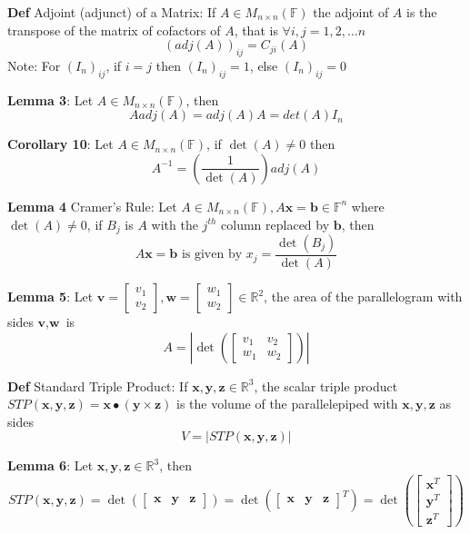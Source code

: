 \documentclass[11pt,notitlepage]{report}
\newcommand{\bb}[1]{\ensuremath{\mathbb{#1}}}
\newcommand{\tbf}[1]{\textbf{#1}}
\begin{document}
\textbf{Def} Adjoint (adjunct) of a Matrix: If $A \in M_{n \times n}(\bb F)$ the adjoint of $A$ is the transpose of the matrix of cofactors of $A$, that is $\forall i, j = 1, 2, \dots n$
$$(adj(A))_{ij} = C_{ji}(A)$$
\hspace*{5mm} Note: For $(I_n)_{ij}$, if $ i = j$ then $(I_n)_{ij} = 1$, else $(I_n)_{ij} = 0$

\textbf{Lemma 3}: Let $A \in M_{n \times n}(\bb F)$, then 
$$A adj(A) = adj(A) A = det(A) I_n$$

\textbf{Corollary 10}: Let $A \in M_{n \times n}(\bb F)$, if $\det(A) \ne 0$ then
$$A^{-1} = \left(\frac{1}{\det(A)}\right)adj(A)$$

\textbf{Lemma 4} Cramer's Rule: Let $A \in M_{n \times n}(\bb F), A\tbf x = \tbf b \in \bb F^n$ where $\det(A) \ne 0$, if $B_j$ is $A$ with the $j^{th}$ column replaced by $\tbf b$, then 
$$A\tbf x = \tbf b \text{ is given by } x_j = \frac{\det(B_j)}{\det(A)}$$

\textbf{Lemma 5}: Let $\tbf v = \begin{bmatrix}v_1\\v_2\end{bmatrix}, \tbf w = \begin{bmatrix}w_1\\w_2\end{bmatrix} \in \bb R^2$, the area of the parallelogram with sides $\tbf v, \tbf w$ is
$$A = \left| \det\left(\begin{bmatrix}v_1 & v_2\\w_1 & w_2\end{bmatrix}\right)\right|$$

\textbf{Def} Standard Triple Product: If $\tbf x, \tbf y, \tbf z \in \bb R^3$, the scalar triple product $STP(\tbf x, \tbf y, \tbf z) = \tbf x \bullet (\tbf y \times \tbf z)$ is the volume of the parallelepiped with $\tbf x, \tbf y, \tbf z$ as sides
$$V = |STP(\tbf x, \tbf y, \tbf z)|$$

\textbf{Lemma 6}: Let $\tbf x, \tbf y, \tbf z \in \bb R^3$, then
$$STP(\tbf x, \tbf y, \tbf z) = \det\left(\begin{bmatrix}\tbf x & \tbf y & \tbf z\end{bmatrix}\right) = \det\left(\begin{bmatrix}\tbf x & \tbf y & \tbf z\end{bmatrix}^T\right) = \det\left(\begin{bmatrix}\tbf x^T \\ \tbf y^T \\ \tbf z^T\end{bmatrix}\right)$$
\end{document}
